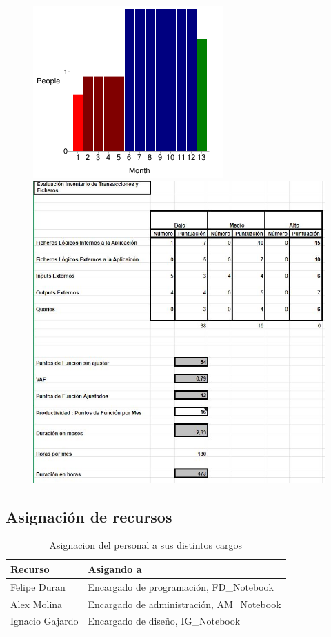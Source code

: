 \begin{figure}[htbp]
	\includegraphics{imgs/Grafica.png}
	\includegraphics[scale=0.5]{imgs/Estimacion de PF.JPG}
\end{figure}

\subsection{Asignación de recursos}
\begin{table}[H]
    \begin{center}
        \begin{tabular}{| l | m{12cm} |}        
        	\hline 
        	Recurso & Asigando a \\
        	\hline
        	Felipe Duran & Encargado de programación, FD\_Notebook\\
        	\hline
        	Alex Molina & Encargado de administración, AM\_Notebook\\
        	\hline
        	Ignacio Gajardo & Encargado de diseño, IG\_Notebook\\
        	\hline
        \end{tabular}
    \caption{Asignacion del personal a sus distintos cargos}
    \end{center}
\end{table}
